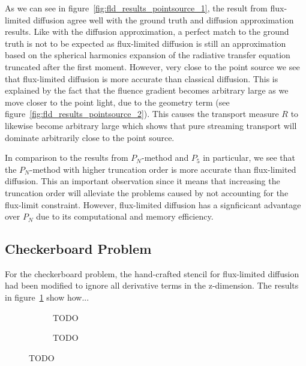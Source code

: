 
As we can see in figure~\ref{fig:fld_results_pointsource_1}, the result from flux-limited diffusion agree well with the ground truth and diffusion approximation results. Like with the diffusion approximation, a perfect match to the ground truth is not to be expected as flux-limited diffusion is still an approximation based on the spherical harmonics expansion of the radiative transfer equation truncated after the first moment. However, very close to the point source we see that flux-limited diffusion is more accurate than classical diffusion. This is explained by the fact that the fluence gradient becomes arbitrary large as we move closer to the point light, due to the geometry term (see figure~\ref{fig:fld_results_pointsource_2}). This causes the transport measure $R$ to likewise become arbitrary large which shows that pure streaming transport will dominate arbitrarily close to the point source.

In comparison to the results from $P_N$-method and $P_5$ in particular, we see that the $P_N$-method with higher truncation order is more accurate than flux-limited diffusion. This an important observation since it means that increasing the truncation order will alleviate the problems caused by not accounting for the flux-limit constraint. However, flux-limited diffusion has a signficicant advantage over $P_N$ due to its computational and memory efficiency.

\subsection{Checkerboard Problem}
\label{sec:pn_results_checkerboard}

For the checkerboard problem, the hand-crafted stencil for flux-limited diffusion had been modified to ignore all derivative terms in the z-dimension. The results in figure~\ref{fig:fld_results_checkerboard_1} show how...
\begin{figure}[h]
\centering
\begin{subfigure}{0.49\columnwidth}
\caption{TODO}
\label{fig:fld_results_checkerboard_1}
\end{subfigure}%
\hspace{0.01\columnwidth}
\begin{subfigure}{0.49\columnwidth}
\caption{TODO}
\label{fig:fld_results_checkerboard_2}
\end{subfigure}%
\caption{TODO}
\label{fig:fld_results_checkerboard}
\end{figure}

